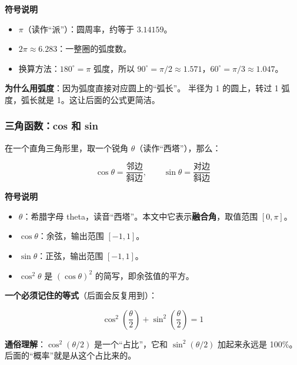 \documentclass[UTF8,a4paper,11pt]{ctexart}
\newenvironment{explainbox}[1]
{\begin{center}\begin{minipage}{0.94\textwidth}\colorbox{boxbg}{\parbox{0.92\textwidth}{\textbf{#1}\par\vspace{2pt}}}}
{\end{minipage}\end{center}}
\newcommand{\hl}[1]{\textcolor{blue!70!black}{\textbf{#1}}}
\begin{document}
\begin{explainbox}{符号说明}
\begin{itemize}[leftmargin=1.4em,itemsep=1pt]
\item $\pi$（读作“派”）：圆周率，约等于 $3.14159$。
\item $2\pi \approx 6.283$：一整圈的弧度数。
\item 换算方法：$180^\circ = \pi$ 弧度，所以 $90^\circ = \pi/2 \approx 1.571$，$60^\circ = \pi/3 \approx 1.047$。
\end{itemize}
\end{explainbox}

\textbf{为什么用弧度}：因为弧度直接对应圆上的“弧长”。
半径为 1 的圆上，转过 1 弧度，弧长就是 1。这让后面的公式更简洁。

\subsubsection{三角函数：cos 和 sin}

在一个直角三角形里，取一个锐角 $\theta$（读作“西塔”），那么：

\begin{equation}
\cos\theta = \frac{\text{邻边}}{\text{斜边}}, \qquad
\sin\theta = \frac{\text{对边}}{\text{斜边}}
\end{equation}

\begin{explainbox}{符号说明}
\begin{itemize}[leftmargin=1.4em,itemsep=1pt]
\item $\theta$：希腊字母 theta，读音“西塔”。本文中它表示\hl{融合角}，取值范围 $[0,\pi]$。
\item $\cos\theta$：余弦，输出范围 $[-1, 1]$。
\item $\sin\theta$：正弦，输出范围 $[-1, 1]$。
\item $\cos^2\theta$ 是 $(\cos\theta)^2$ 的简写，即余弦值的平方。
\end{itemize}
\end{explainbox}

\textbf{一个必须记住的等式}（后面会反复用到）：

\begin{equation}
\cos^2\!\left(\frac{\theta}{2}\right) + \sin^2\!\left(\frac{\theta}{2}\right) = 1
\end{equation}

\textbf{通俗理解}：$\cos^2(\theta/2)$ 是一个“占比”，它和 $\sin^2(\theta/2)$ 加起来永远是 100\%。
后面的“概率”就是从这个占比来的。
\end{document}
